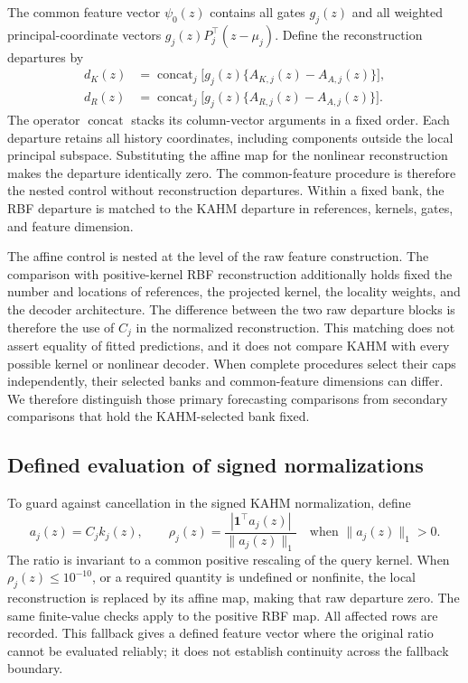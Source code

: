 The common feature vector $\psi_0(z)$ contains all gates $g_j(z)$ and
all weighted principal-coordinate vectors $g_j(z)P_j^\top(z-\mu_j)$.
Define the reconstruction departures by
\begin{equation}
 \begin{split}
 d_K(z)&=\operatorname{concat}_{j}
       \bigl[g_j(z)\{A_{K,j}(z)-A_{A,j}(z)\}\bigr],\\
 d_R(z)&=\operatorname{concat}_{j}
       \bigl[g_j(z)\{A_{R,j}(z)-A_{A,j}(z)\}\bigr].
 \end{split}
 \label{eq:mechanism-main-departures}
\end{equation}
The operator $\operatorname{concat}$ stacks its column-vector arguments
in a fixed order. Each departure retains all history coordinates,
including components outside the local principal subspace. Substituting
the affine map for the nonlinear reconstruction makes the departure
identically zero. The common-feature procedure is therefore the nested
control without reconstruction departures. Within a fixed bank, the RBF
departure is matched to the KAHM departure in references, kernels, gates,
and feature dimension.


The affine control is nested at the level of the raw feature construction.
The comparison with positive-kernel RBF reconstruction additionally holds
fixed the number and locations of references, the projected kernel, the
locality weights, and the decoder architecture. The difference between
the two raw departure blocks is therefore the use of $C_j$ in the
normalized reconstruction. This matching does not assert equality of
fitted predictions, and it does not compare KAHM with every possible
kernel or nonlinear decoder. When complete procedures select their caps
independently, their selected banks and common-feature dimensions can
differ. We therefore distinguish those primary forecasting comparisons
from secondary comparisons that hold the KAHM-selected bank fixed.

\subsection{Defined evaluation of signed normalizations}

To guard against cancellation in the signed KAHM normalization, define
\begin{equation}
 a_j(z)=C_j k_j(z),\qquad
 \rho_j(z)=\frac{|\mathbf1^\top a_j(z)|}{\|a_j(z)\|_1}
 \quad\text{when }\|a_j(z)\|_1>0.
 \label{eq:mechanism-relative-denominator}
\end{equation}
The ratio is invariant to a common positive rescaling of the query kernel.
When $\rho_j(z)\le10^{-10}$, or a required quantity is undefined or
nonfinite, the local reconstruction is replaced by its affine map, making
that raw departure zero. The same finite-value checks apply to the positive
RBF map. All affected rows are recorded. This fallback gives a defined
feature vector where the original ratio cannot be evaluated reliably;
it does not establish continuity across the fallback boundary.


